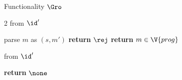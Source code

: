 \begin{interface}[nofloat]{Functionality $\Gro$ \\
}
{\begin{multicols}{2}
 \quad from $\id'$
\begin{algorithmic}[1]
\algcont
\State parse $m$ as $(s,m')$
  \State \textbf{return} $\rej$ \label{ln:roisprogscope}
\EndIf
\State \textbf{return} $m \in \V{prog}$ \label{ln:roisprog}
\algsave
\end{algorithmic}
\vspace{1.4ex}

 \quad from $\id'$
\begin{algorithmic}[1]
\algcont
\State \textbf{return} $\none$ \label{ln:roleak}
\algsave
\end{algorithmic}
\end{multicols}}
\end{interface}
